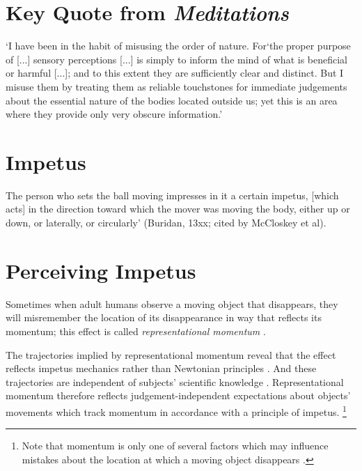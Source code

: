 \documentclass[12pt]{extarticle}
\begin{document}
\begin{multicols*}{3}
\section{Key Quote from \emph{Meditations}}
 
‘I have been in the habit of misusing the order of nature. For‘the proper purpose of [...] sensory perceptions [...] is simply to inform the mind of what is beneficial or harmful [...]; 
 and to this extent they are sufficiently clear and distinct. 
 But I misuse them by treating them as reliable touchstones for immediate judgements about the essential nature of the bodies located outside us; 
 yet this is an area where they provide only very obscure information.’ 
\citep[pp.~57-8]{descartes:1985_csm2}
 
\section{Impetus}
 
The person who sets the ball moving impresses in it a certain impetus,
[which acts] in the direction toward which the mover was moving the body,
either up or down, or laterally, or circularly’ (Buridan, 13xx; cited by McCloskey et al).
 
\section{Perceiving Impetus}
 
Sometimes when adult humans observe a moving object that disappears, they will misremember the location of its disappearance in way that reflects its momentum; this effect is called \emph{representational momentum} \citep{freyd:1984_representational,hubbard:2010_rm}.
 
The trajectories implied by representational momentum reveal that the effect reflects impetus mechanics rather than Newtonian principles \citep{freyd:1994_representational,kozhevnikov:2001_impetus,hubbard:2001_representational,hubbard:2013_launching}.
And these trajectories are independent of subjects' scientific knowledge
\citep{freyd:1994_representational,kozhevnikov:2001_impetus}.
Representational momentum therefore reflects judgement-independent expectations about objects’ movements which 
track momentum in accordance with a principle of impetus.%
\footnote{
Note that momentum is only one of several factors which may influence mistakes about the location at which a moving object disappears \citep[p.\ 842]{hubbard:2005_representational}.
%
%
}
 

\end{multicols*}
\end{document}
